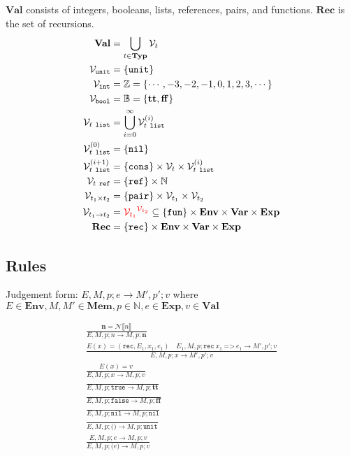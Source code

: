 \documentclass{article}
\newcommand{\btt}{\mathbf{tt}}
\newcommand{\bff}{\mathbf{ff}}
\begin{document}
$\mathbf{Val}$ consists of integers, booleans, lists, references, pairs, and functions.  $\mathbf{Rec}$ is the set of recursions.
\begin{align*}
  \mathbf{Val} &= \bigcup_{t\in\mathbf{Typ}}\mathcal{V}_t \\
  \mathcal{V}_\texttt{unit} &= \{ \texttt{unit} \} \\
  \mathcal{V}_\texttt{int} &= \mathbb{Z} = \{\cdots,-3,-2,-1,0,1,2,3,\cdots\}\\
  \mathcal{V}_\texttt{bool} &= \mathbb{B} = \{\btt,\bff\} \\
  \mathcal{V}_{t\ \texttt{list}} &= \bigcup_{i=0}^{\infty}\mathcal{V}_{t\ \texttt{list}}^{(i)} \\
  \mathcal{V}_{t\ \texttt{list}}^{(0)} &= \{ \texttt{nil} \} \\
  \mathcal{V}_{t\ \texttt{list}}^{(i+1)} &= \{\texttt{cons}\}\times\mathcal{V}_t\times\mathcal{V}_{t\ \texttt{list}}^{(i)} \\
  \mathcal{V}_{t\ \texttt{ref}} &= \{\texttt{ref}\}\times\mathbb{N} \\
  \mathcal{V}_{t_1\times t_2} &= \{\texttt{pair}\}\times\mathcal{V}_{t_1}\times\mathcal{V}_{t_2} \\
  \mathcal{V}_{t_1\rightarrow t_2} &= \textcolor{red}{{\mathcal{V}_{t_1}}^{\mathcal{V}_{t_2}}} \subseteq \{\texttt{fun}\}\times\mathbf{Env}\times\mathbf{Var}\times\mathbf{Exp} \\
  \mathbf{Rec} &= \{\texttt{rec}\}\times\mathbf{Env}\times\mathbf{Var}\times\mathbf{Exp}
\end{align*}

\subsection{Rules}

Judgement form: $E,M,p;e\rightarrow M',p';v$ where $E\in\mathbf{Env}, M,M'\in\mathbf{Mem}, p\in\mathbb{N}, e\in\mathbf{Exp}, v\in\mathbf{Val}$

\begin{align*}
\tag{\sc E-Int}
\frac{\mathbf{n}=\mathcal{N}\llbracket n\rrbracket}
{E,M,p;n\rightarrow M,p;\mathbf{n}}
\\
\tag{\sc E-Name1}
\frac{E(x)=(\texttt{rec},E_1,x_1,e_1) \quad E_1,M,p;\texttt{rec}\ x_1\ \texttt{=>}\ e_1\rightarrow M',p';v}
{E,M,p;x\rightarrow M',p';v}
\\
\tag{\sc E-Name2}
\frac{E(x)=v}
{E,M,p;x\rightarrow M,p;v}
\\
\tag{\sc E-True}
\frac{}
{E,M,p;\texttt{true}\rightarrow M,p;\btt}
\\
\tag{\sc E-False}
\frac{}
{E,M,p;\texttt{false}\rightarrow M,p;\bff}
\\
\tag{\sc E-Nil}
\frac{}
{E,M,p;\texttt{nil}\rightarrow M,p;\texttt{nil}}
\\
\tag{\sc E-Unit}
\frac{}
{E,M,p;\texttt{()}\rightarrow M,p;\texttt{unit}}
\\
\tag{\sc E-Group}
\frac{E,M,p;e\rightarrow M,p;v}
{E,M,p;\texttt{(}e\texttt{)}\rightarrow M,p;v}
\end{align*}
\end{document}
